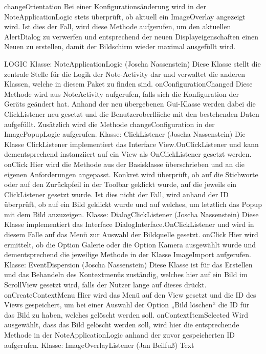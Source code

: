 changeOrientation
Bei einer Konfigurationsänderung wird in der NoteApplicationLogic stets überprüft, ob aktuell ein ImageOverlay angezeigt wird. Ist dies der Fall, wird diese Methode aufgerufen, um den aktuellen AlertDialog zu verwerfen und entsprechend der neuen Displayeigenschaften einen Neuen zu erstellen, damit der Bildschirm wieder maximal ausgefüllt wird.

LOGIC
Klasse: NoteApplicationLogic (Joscha Nassenstein)
Diese Klasse stellt die zentrale Stelle für die Logik der Note-Activity dar und verwaltet die anderen Klassen, welche in diesem Paket zu finden sind.
onConfigurationChanged
Diese Methode wird aus NoteActivity aufgerufen, falls sich die Konfiguration der Geräts geändert hat. Anhand der neu übergebenen Gui-Klasse werden dabei die ClickListener neu gesetzt und die Benutzeroberfläche mit den bestehenden Daten aufgefüllt. Zusätzlich wird die Methode changeConfiguration in der ImagePopupLogic aufgerufen.
Klasse: ClickListener (Joscha Nassenstein)
Die Klasse ClickListener implementiert das Interface View.OnClickListener und kann dementsprechend instanziiert auf ein View als OnClickListener gesetzt werden.
onClick
Hier wird die Methode aus der Basisklasse überschrieben und an die eigenen Anforderungen angepasst. Konkret wird überprüft, ob auf die Stichworte oder auf den Zurückpfeil in der Toolbar geklickt wurde, auf die jeweils ein ClickListener gesetzt wurde. Ist dies nicht der Fall, wird anhand der ID überprüft, ob auf ein Bild geklickt wurde und auf welches, um letztlich das Popup mit dem Bild anzuzeigen.
Klasse: DialogClickListener (Joscha Nassenstein)
Diese Klasse implementiert das Interface DialogInterface.OnClickListener und wird in diesem Falle auf das Menü zur Auswahl der Bildquelle gesetzt.
onClick
Hier wird ermittelt, ob die Option Galerie oder die Option Kamera ausgewählt wurde und dementsprechend die jeweilige Methode in der Klasse ImageImport aufgerufen.
Klasse: EventDispersion (Joscha Nassenstein)
Diese Klasse ist für das Erstellen und das Behandeln des Kontextmenüs zuständig, welches hier auf ein Bild im ScrollView gesetzt wird, falls der Nutzer lange auf dieses drückt.
onCreateContextMenu
Hier wird das Menü auf den View gesetzt und die ID des Views gespeichert, um bei einer Auswahl der Option „Bild löschen“ die ID für das Bild zu haben, welches gelöscht werden soll.
onContextItemSelected
Wird ausgewählt, dass das Bild gelöscht werden soll, wird hier die entsprechende Methode in der NoteApplicationLogic anhand der zuvor gespeicherten ID aufgerufen.
Klasse: ImageOverlayListener (Jan Beilfuß)
Text

